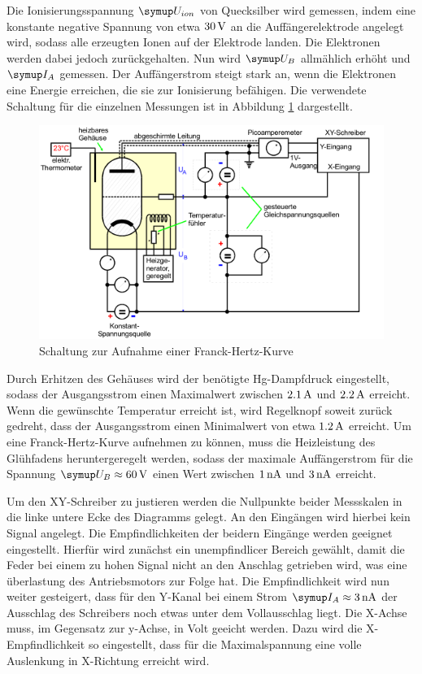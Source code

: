 Die Ionisierungsspannung $\su{U_{ion}}$ von Quecksilber wird gemessen, indem eine
konstante negative Spannung von etwa $30\,\si{\volt}$ an die Auffängerelektrode angelegt
wird, sodass alle erzeugten Ionen auf der Elektrode landen. Die Elektronen werden
dabei jedoch zurückgehalten.
Nun wird $\su{U_B}$ allmählich erhöht und $\su{I_A}$ gemessen. Der Auffängerstrom
steigt stark an, wenn die Elektronen eine Energie erreichen, die sie zur
Ionisierung befähigen.
Die verwendete Schaltung für die einzelnen Messungen ist in Abbildung \ref{fig:schalt}
dargestellt.
\begin{figure}
  \includegraphics{bilder/schalt.jpg}
  \caption{Schaltung zur Aufnahme einer Franck-Hertz-Kurve \cite{601}}
  \label{fig:schalt}
\end{figure}
\newpage
Durch Erhitzen des Gehäuses wird der benötigte Hg-Dampfdruck eingestellt, sodass
der Ausgangsstrom einen Maximalwert zwischen $2.1\,\si{\ampere}$ und $2.2\,\si{\ampere}$ erreicht.
Wenn die gewünschte Temperatur erreicht ist, wird Regelknopf soweit zurück
gedreht, dass der Ausgangsstrom einen Minimalwert von etwa $1.2\,\si{\ampere}$ erreicht.
Um eine Franck-Hertz-Kurve aufnehmen zu können, muss die Heizleistung des
Glühfadens heruntergeregelt werden, sodass der maximale Auffängerstrom für die
Spannung $\su{U_B}\approx60\Volt$ einen Wert zwischen $1\,\si{\nano\ampere}$ und $3\,\si{\nano\ampere}$ erreicht.

Um den XY-Schreiber zu justieren werden die Nullpunkte beider Messskalen in die
linke untere Ecke des Diagramms gelegt. An den Eingängen wird hierbei kein
Signal angelegt. Die Empfindlichkeiten der beidern Eingänge werden geeignet
eingestellt. Hierfür wird zunächst ein unempfindlicer Bereich gewählt, damit
die Feder bei einem zu hohen Signal nicht an den Anschlag getrieben wird, was
eine überlastung des Antriebsmotors zur Folge hat. Die Empfindlichkeit wird nun
weiter gesteigert, dass für den Y-Kanal bei einem Strom $\su{I_A}\approx3\nA$
der Ausschlag des Schreibers noch etwas unter dem Vollausschlag liegt. Die
X-Achse muss, im Gegensatz zur y-Achse, in Volt geeicht werden. Dazu wird
die X-Empfindlichkeit so eingestellt, dass für die Maximalspannung eine volle
Auslenkung in X-Richtung erreicht wird.
